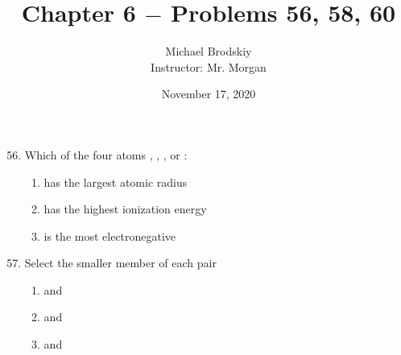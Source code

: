 \documentclass[12pt]{article}
\title{Chapter 6 $-$ Problems 56, 58, 60}
\date{November 17, 2020}
\author{Michael Brodskiy\\ \small Instructor: Mr. Morgan}
\begin{document}
\maketitle

\begin{enumerate}

    \setcounter{enumi}{55}

  \item Which of the four atoms , , , or :

    \begin{enumerate}

      \item has the largest atomic radius

        \begin{justifying}
        \end{justifying}

      \item has the highest ionization energy

        \begin{justifying}
        \end{justifying}

      \item is the most electronegative

        \begin{justifying}
        \end{justifying}

    \end{enumerate}

    \setcounter{enumi}{57}

  \item Select the smaller member of each pair

    \begin{enumerate}

      \item {} and 

        \begin{justifying}
        \end{justifying}

      \item {} and 

        \begin{justifying}
        \end{justifying}

      \item {} and 


\end{enumerate}
\end{enumerate}
\end{document}
